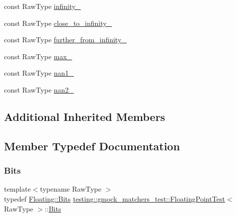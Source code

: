 \begin{DoxyCompactItemize}
\item 
const Raw\+Type \mbox{\hyperlink{classtesting_1_1gmock__matchers__test_1_1_floating_point_test_a21d8a019a6365ddff80e301a6163f43f}{infinity\+\_\+}}
\item 
const Raw\+Type \mbox{\hyperlink{classtesting_1_1gmock__matchers__test_1_1_floating_point_test_a6fc8ac2030f4883e1c84da3a21bbb7c3}{close\+\_\+to\+\_\+infinity\+\_\+}}
\item 
const Raw\+Type \mbox{\hyperlink{classtesting_1_1gmock__matchers__test_1_1_floating_point_test_a603ab51280ecb1c4147c2660a7a90728}{further\+\_\+from\+\_\+infinity\+\_\+}}
\item 
const Raw\+Type \mbox{\hyperlink{classtesting_1_1gmock__matchers__test_1_1_floating_point_test_a17b9dd56136b64fa7210bfe024d88c30}{max\+\_\+}}
\item 
const Raw\+Type \mbox{\hyperlink{classtesting_1_1gmock__matchers__test_1_1_floating_point_test_a0d2544956414eac21d4519fe600e4603}{nan1\+\_\+}}
\item 
const Raw\+Type \mbox{\hyperlink{classtesting_1_1gmock__matchers__test_1_1_floating_point_test_a4af3b3e53a06d271479ff30f5d5ee155}{nan2\+\_\+}}
\end{DoxyCompactItemize}
\subsection*{Additional Inherited Members}


\subsection{Member Typedef Documentation}
\mbox{\label{classtesting_1_1gmock__matchers__test_1_1_floating_point_test_addf899bd832ae51103198d201d2f2ea2}} 
\subsubsection{\texorpdfstring{Bits}{Bits}}
{\footnotesize\ttfamily template$<$typename Raw\+Type $>$ \\
typedef \mbox{\hyperlink{classtesting_1_1internal_1_1_floating_point_abf228bf6cd48f12c8b44c85b4971a731}{Floating\+::\+Bits}} \mbox{\hyperlink{classtesting_1_1gmock__matchers__test_1_1_floating_point_test}{testing\+::gmock\+\_\+matchers\+\_\+test\+::\+Floating\+Point\+Test}}$<$ Raw\+Type $>$\+::\mbox{\hyperlink{classtesting_1_1gmock__matchers__test_1_1_floating_point_test_addf899bd832ae51103198d201d2f2ea2}{Bits}}\hspace{0.3cm}{\ttfamily [protected]}}


